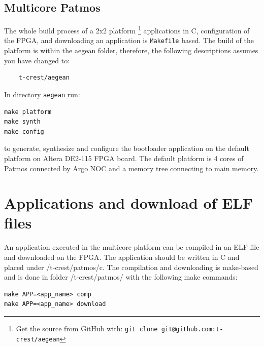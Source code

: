 \documentclass[a4paper,fontsize=10pt,twoside,DIV15,BCOR12mm,headinclude=true,footinclude=false,pagesize,bibtotoc]{scrbook}
\newcommand{\code}[1]{{\texttt{#1}}}
\begin{document}
\subsection{Multicore Patmos}

The whole build process of a 2x2 platform
\footnote{Get the source from GitHub with: \code{git clone git@github.com:t-crest/aegean}} 
applications %
in C, configuration of the FPGA, and downloading an application
is \code{Makefile} based. The build of the platform is within the aegean folder,
therefore, the following descriptions assumes you have changed to:

\begin{verbatim}
	t-crest/aegean
\end{verbatim}

In directory \code{aegean} run:

\begin{verbatim}
make platform
make synth
make config
\end{verbatim}

to generate, synthesize and configure the bootloader application on the default platform on Altera DE2-115 FPGA board. The default platform is 4 cores of Patmos connected by Argo NOC and a memory tree connecting to main memory.

\section{Applications and download of ELF files}

An application executed in the multicore platform can be compiled in an ELF file and downloaded on the FPGA.
The application should be written in C and placed under /t-crest/patmos/c. The compilation and downloading
is make-based and is done in folder /t-crest/patmos/ with the following make commands:

\begin{verbatim}
make APP=<app_name> comp
make APP=<app_name> download
\end{verbatim}
\end{document}
